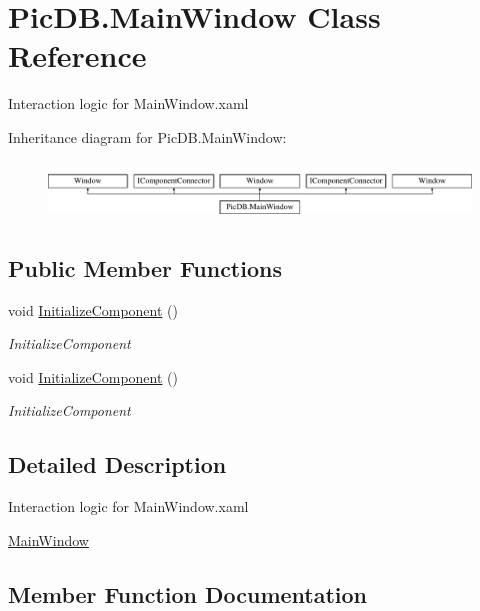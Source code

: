 \hypertarget{class_pic_d_b_1_1_main_window}{}\section{Pic\+D\+B.\+Main\+Window Class Reference}
\label{class_pic_d_b_1_1_main_window}


Interaction logic for Main\+Window.\+xaml  


Inheritance diagram for Pic\+D\+B.\+Main\+Window\+:\begin{figure}[H]
\begin{center}
\leavevmode
\includegraphics[height=1.544828cm]{class_pic_d_b_1_1_main_window}
\end{center}
\end{figure}
\subsection*{Public Member Functions}
\begin{DoxyCompactItemize}
\item 
void \mbox{\hyperlink{class_pic_d_b_1_1_main_window_a5b3ff51020040626afa96b204d0e41c6}{Initialize\+Component}} ()
\begin{DoxyCompactList}\small\item\em Initialize\+Component \end{DoxyCompactList}\item 
void \mbox{\hyperlink{class_pic_d_b_1_1_main_window_a5b3ff51020040626afa96b204d0e41c6}{Initialize\+Component}} ()
\begin{DoxyCompactList}\small\item\em Initialize\+Component \end{DoxyCompactList}\end{DoxyCompactItemize}


\subsection{Detailed Description}
Interaction logic for Main\+Window.\+xaml 

\mbox{\hyperlink{class_pic_d_b_1_1_main_window}{Main\+Window}} 

\subsection{Member Function Documentation}
\mbox{\label{class_pic_d_b_1_1_main_window_a5b3ff51020040626afa96b204d0e41c6}} 
